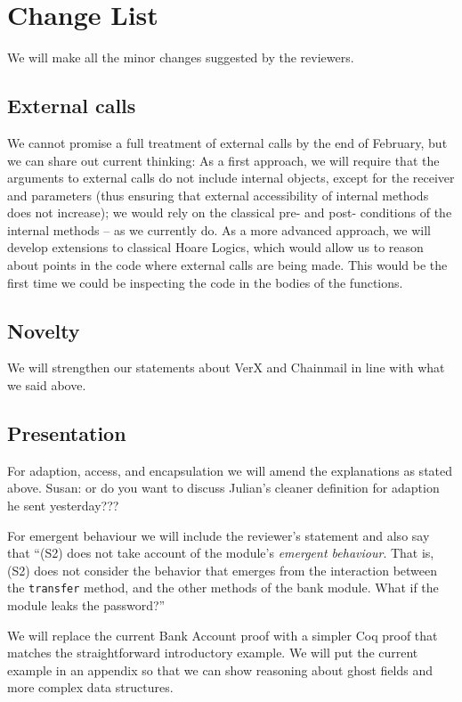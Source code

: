 \documentclass[11pt]{amsart}
\begin{document}
 \section{Change List}
  We will make all the minor changes suggested by the reviewers.
 \subsection*{External calls}
 We cannot promise a full treatment of external calls by the end of February, but we can share out current thinking:  As a first approach, we will require that the arguments to external calls do not include internal objects, except for the receiver and parameters (thus ensuring that external accessibility of internal methods does not increase); we would rely on the classical pre- and post- conditions of the internal methods -- as we currently do. As a more advanced approach, we will develop extensions to classical Hoare Logics, which would allow us to reason about points in the code where external calls are being made. This would be the first time we could be inspecting the code in the bodies of the functions.
 \subsection*{Novelty}
 We will strengthen our statements about VerX and Chainmail in line with what we said above.
 
 \subsection*{Presentation}
 
 For adaption, access, and encapsulation we will amend the explanations as stated above. Susan: or do you want to discuss Julian's cleaner definition for adaption he sent yesterday???
 
 For emergent behaviour we will include the reviewer's statement and also say that ``(S2) does not take account of the module's \emph{emergent behaviour}. That is, (S2) does not consider the behavior that emerges from the interaction between the 
\texttt{transfer} method, and the other methods of the bank module. What if the module leaks the password?''
 
 We will replace the current Bank Account proof with a simpler Coq proof that matches the straightforward introductory example. We will put the current example in an appendix so that we can 
show reasoning about ghost fields and more complex data structures. 
\end{document}
